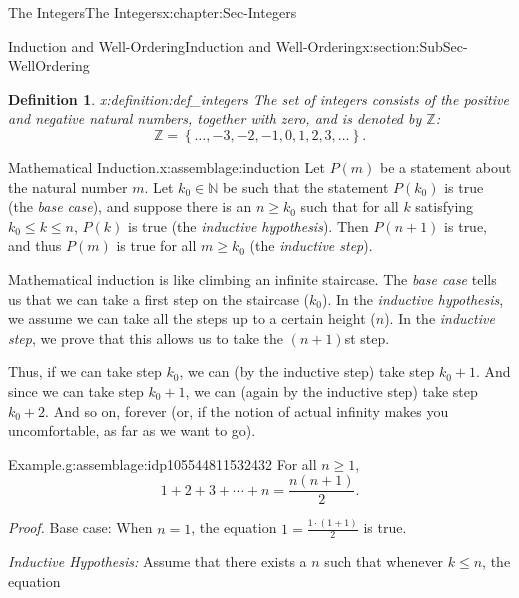 \documentclass[oneside,10pt,]{book}
\numberwithin{equation}{section}
\renewcommand{\le}{\leqslant}
\renewcommand{\ge}{\geqslant}
\newcommand{\set}[1]{\left\{ {#1} \right\}}
\def\Z{{\mathbb Z}}
\def\N{{\mathbb N}}
\newtheorem{definition}[theorem]{Definition}
\begin{document}
\begin{chapterptx}{The Integers}{}{The Integers}{}{}{x:chapter:Sec-Integers}
\begin{sectionptx}{Induction and Well-Ordering}{}{Induction and Well-Ordering}{}{}{x:section:SubSec-WellOrdering}
%
\begin{definition}{}{x:definition:def_integers}%
\index{\(\Z\)} The set of integers consists of the positive and negative natural numbers, together with zero, and is denoted by \(\Z\):%
\begin{equation*}
\Z = \set{\ldots, -3, -2, -1, 0, 1, 2, 3, \ldots}\text{.}
\end{equation*}
%
\end{definition}
\begin{assemblage}{Mathematical Induction.}{x:assemblage:induction}%
Let \(P(m)\) be a statement about the natural number \(m\)\footnotemark{}. Let \(k_0\in \N\) be such that the statement \(P(k_0)\) is true (the \emph{base case}), and suppose there is an \(n\ge k_0\) such that for all \(k\) satisfying \(k_0 \le k \le n\), \(P(k)\) is true (the \emph{inductive hypothesis}). Then \(P(n+1)\) is true, and thus \(P(m)\) is true for all \(m\ge k_0\) (the \emph{inductive step}).%
\end{assemblage}
%
Mathematical induction is like climbing an infinite staircase. The \emph{base case} tells us that we can take a first step on the staircase (\(k_0\)). In the \emph{inductive hypothesis}, we assume we can take all the steps up to a certain height (\(n\)). In the \emph{inductive step}, we prove that this allows us to take the \((n+1)\)st step.%
\par
Thus, if we can take step \(k_0\), we can (by the inductive step) take step \(k_0 + 1\). And since we can take step \(k_0 + 1\), we can (again by the inductive step) take step \(k_0 + 2\). And so on, forever (or, if the notion of actual infinity makes you uncomfortable, as far as we want to go).%
\begin{assemblage}{Example.}{g:assemblage:idp105544811532432}%
For all \(n \ge 1\),%
\begin{equation*}
1+ 2 + 3 + \cdots + n = \frac{n(n+1)}{2}\text{.}
\end{equation*}
%
\par
\emph{Proof.} Base case: When \(n = 1\), the equation \(1 = \frac{1\cdot (1+1)}{2}\) is true.%
\par
\emph{Inductive Hypothesis:} Assume that there exists a \(n\) such that whenever \(k \le n\), the equation%
\begin{equation}

\end{equation}
\end{assemblage}
\end{sectionptx}
\end{chapterptx}
\end{document}
